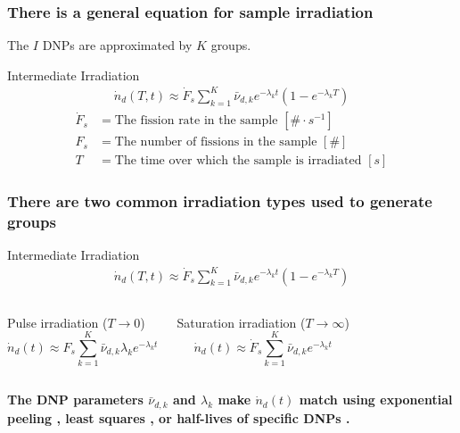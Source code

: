 \begin{frame}
  \frametitle{There is a general equation for sample irradiation}
  The $I$ \glspl{DNP} are approximated by $K$ groups.
  \begin{block}{Intermediate Irradiation}
    \begin{align}
\dot{n}_{d}(T, t) \approx \dot{F}_s \sum_{k=1}^K \bar{\nu}_{d, k} e^{-\lambda_k t} \left(1 - e^{-\lambda_k T} \right)
\end{align}
\begin{align}
	\dot{F}_s &= \text{The fission rate in the sample $[\# \cdot s^{-1}]$} \nonumber \\
	{F}_s &= \text{The number of fissions in the sample $[\#]$} \nonumber \\
	T &= \text{The time over which the sample is irradiated $[s]$} \nonumber
\end{align}
\end{block}
\end{frame}



\begin{frame}
  \frametitle{There are two common irradiation types used to generate groups}
  \begin{block}{Intermediate Irradiation}
    \begin{align}
\dot{n}_{d}(T, t) \approx \dot{F}_s \sum_{k=1}^K \bar{\nu}_{d, k} e^{-\lambda_k t} \left(1 - e^{-\lambda_k T} \right)
\end{align}
  \end{block}
    \begin{columns}
            \begin{block}{Pulse irradiation ($T \rightarrow 0$)}
                \begin{equation}
                \dot{n}_d(t) \approx F_s \sum_{k=1}^{K}  \bar{\nu}_{d, k} \lambda_k e^{-\lambda_k t}
                \label{eq:delnu-fit}
                \end{equation}
            \end{block}
            \begin{block}{Saturation irradiation ($T \rightarrow \infty$)}
                \begin{equation}
                \dot{n}_d(t) \approx \dot{F}_s \sum_{k=1}^{K}  \bar{\nu}_{d, k} e^{-\lambda_k t}
                \label{eq:delnu-fit-sat}
                \end{equation}
            \end{block}
    \end{columns}
    \vspace{2mm}
    \textbf{The \gls{DNP} parameters $\bar{\nu}_{d,k}$ and $\lambda_k$ make $\dot{n}_d(t)$ match using exponential peeling \cite{brunson1955measurement, keepin1955delayed}, least squares \cite{brady1988evaluation, keepin1957delayed}, or half-lives of specific \glspl{DNP} \cite{saphier1977evaluated}.}
\end{frame}
